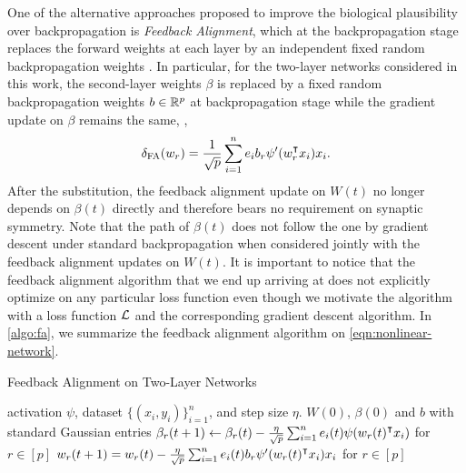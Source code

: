 One of the alternative approaches proposed to improve the biological plausibility over backpropagation is \emph{Feedback Alignment}, which at the backpropagation stage replaces the forward weights at each layer by an independent fixed random backpropagation weights \citep{lillicrap2016random}. In particular, for the two-layer networks considered in this work, the second-layer weights $\beta$ is replaced by a fixed random backpropagation weights $b\in{\mathbb{R}^{p}}$ at backpropagation stage while the gradient update on $\beta$ remains the same, \ie,
\begin{align}\label{eqn:alignment-update}
    \dfa(w_r) = \frac{1}{\sqrt{p}} \sum_{i=1}^n e_i b_r\psi'(w_r\transpose x_i)x_i.
\end{align}
After the substitution, the feedback alignment update on $W(t)$ no longer depends on $\beta(t)$ directly and therefore bears no requirement on synaptic symmetry. Note that the path of $\beta(t)$ does not follow the one by gradient descent under standard backpropagation when considered jointly with the feedback alignment updates on $W(t)$. It is important to notice that the feedback alignment algorithm that we end up arriving at does not explicitly optimize on any particular loss function even though we motivate the algorithm with a loss function $\mathcal{L}$ and the corresponding gradient descent algorithm.
In \cref{algo:fa}, we summarize the feedback alignment algorithm on \eqref{eqn:nonlinear-network}.

\begin{algorithm}[H]
\centering
\caption{Feedback Alignment on Two-Layer Networks}\label{algo:fa}
    \begin{algorithmic}[1]
        \Require activation $\psi$, dataset $\{(x_i,y_i)\}_{i=1}^n$, and step size $\eta$.
         $W(0)$, $\beta(0)$ and $b$ with standard Gaussian entries
            \State $\beta_r(t+1) \gets \beta_r(t) - \frac{\eta}{\sqrt p} \sum_{i=1}^n e_i(t)\psi(w_r(t)\transpose x_i)$ for $r\in[p]$
            \State $w_r(t+1) = w_r(t) - \frac{\eta}{\sqrt{p}} \sum_{i=1}^n e_i(t) b_r\psi'(w_r(t)\transpose x_i)x_i$ for $r\in[p]$
        \EndWhile
    \end{algorithmic}    
\end{algorithm}%


